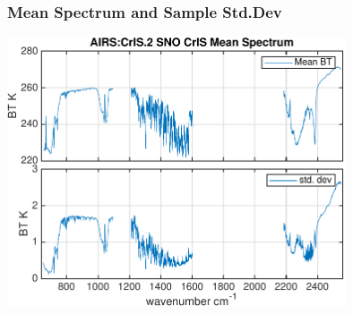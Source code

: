 \documentclass[10pt,t]{beamer} \usepackage[utf8]{inputenc}
\begin{document}
\begin{frame}
  \frametitle{Mean Spectrum and Sample Std.Dev}
  \begin{center}
    \noindent\includegraphics[width=0.75\textwidth]{Figs/sno_airs_cris2_mean_std_spectrum_polz.pdf}
  \end{center}
\end{frame}
\end{document}
